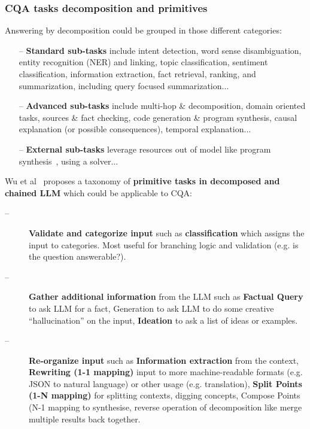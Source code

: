 \documentclass[acmsmall]{acmart}
\begin{document}
\subsubsection{\textbf{CQA tasks decomposition and primitives}}
Answering by decomposition could be grouped in those different categories:
\begin{itemize}
    \item[--] \textbf{Standard sub-tasks} include intent detection, word sense disambiguation, entity recognition (NER) and linking, topic classification, sentiment classification, information extraction, fact retrieval, ranking, and summarization, including query focused summarization...
    \item[--] \textbf{Advanced sub-tasks} include multi-hop \& decomposition, domain oriented tasks, sources \& fact checking, code generation \& program synthesis, causal explanation (or possible consequences), temporal explanation...
    \item[--] \textbf{External sub-tasks} leverage resources out of model like program synthesis~\citep{droriNeuralNetworkSolves2022}, using a solver...
\end{itemize}

Wu et al~\citep{wuAIChainsTransparent2022} proposes a taxonomy of \textbf{primitive tasks in decomposed and chained LLM} which could be applicable to CQA:
\begin{description}
    \item[--] \textbf{Validate and categorize input} such as \textbf{classification} which assigns the input to categories. Most useful for branching logic and validation (e.g. is the question answerable?).
    \item[--] \textbf{Gather additional information} from the LLM such as \textbf{Factual Query} to ask LLM for a fact, {Generation} to ask LLM to do some creative “hallucination” on the input, \textbf{Ideation} to ask a list of ideas or examples.
    \item[--] \textbf{Re-organize input} such as \textbf{Information extraction} from the context, \textbf{Rewriting (1-1 mapping)} input to more machine-readable formats (e.g. JSON to natural language) or other usage (e.g. translation), \textbf{Split Points (1-N mapping)} for splitting contexts, digging concepts, {Compose Points (N-1 mapping} to  synthesise, reverse operation of decomposition like merge multiple results back together.
\end{description}
\end{document}
